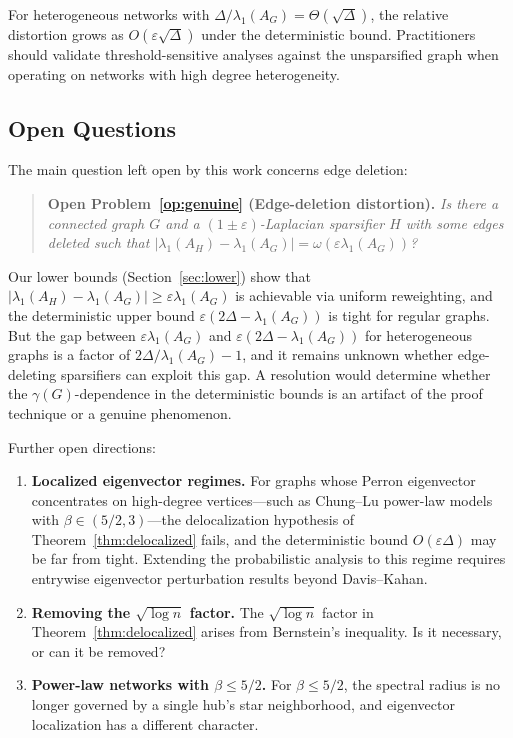 \documentclass[11pt]{article}
\theoremstyle{definition}
\newcommand{\eps}{\varepsilon}
\newcommand{\lamH}{\lambda_1(A_H)}
\newcommand{\lamG}{\lambda_1(A_G)}
\begin{document}
For heterogeneous networks with $\Delta/\lamG = \Theta(\sqrt{\Delta})$,
the relative distortion grows as $O(\eps\sqrt{\Delta})$ under the deterministic bound.
Practitioners should validate threshold-sensitive analyses against the unsparsified graph
when operating on networks with high degree heterogeneity.

\subsection{Open Questions}

The main question left open by this work concerns
edge deletion:

\begin{quote}
\textbf{Open Problem~\ref{op:genuine} (Edge-deletion distortion).}
\emph{Is there a connected graph $G$ and a $(1\pm\eps)$-Laplacian sparsifier
$H$ with some edges deleted such that $|\lamH - \lamG| = \omega(\eps\lamG)$?}
\end{quote}

\noindent Our lower bounds (Section~\ref{sec:lower}) show that
$|\lamH - \lamG| \geq \eps\lamG$ is achievable via uniform reweighting,
and the deterministic upper bound $\eps(2\Delta - \lamG)$ is tight for
regular graphs. But the gap between $\eps\lamG$ and
$\eps(2\Delta - \lamG)$ for heterogeneous graphs is a factor of
$2\Delta/\lamG - 1$, and it remains unknown whether edge-deleting
sparsifiers can exploit this gap. A resolution would determine whether the
$\gamma(G)$-dependence in the deterministic bounds is an artifact of the proof
technique or a genuine phenomenon.

Further open directions:

\begin{enumerate}[label=(\arabic*)]
\item \textbf{Localized eigenvector regimes.}
For graphs whose Perron eigenvector concentrates on high-degree vertices---such as
Chung--Lu power-law models with $\beta \in (5/2, 3)$---the delocalization hypothesis
of Theorem~\ref{thm:delocalized} fails, and the deterministic bound
$O(\eps\Delta)$ may be far from tight. Extending the probabilistic analysis to
this regime requires entrywise eigenvector perturbation results beyond
Davis--Kahan.

\item \textbf{Removing the $\sqrt{\log n}$ factor.}
The $\sqrt{\log n}$ factor in Theorem~\ref{thm:delocalized} arises from
Bernstein's inequality. Is it necessary, or can it be removed?

\item \textbf{Power-law networks with $\beta \leq 5/2$.}
For $\beta \leq 5/2$, the spectral radius is no longer governed by a single hub's
star neighborhood, and eigenvector localization has a different character.
\end{enumerate}
\end{document}
